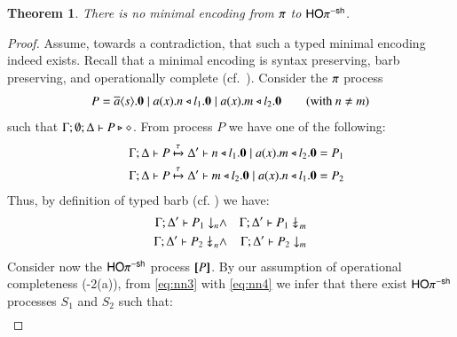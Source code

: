 \documentclass[preprint,11pt]{elsarticle}
\newtheorem{theorem}{Theorem}[section]
\begin{document}
{{%

\begin{theorem}%
	\label{t:negative}
	There is no minimal encoding from
		$\pi$ to $\mathsf{HO}\pi^{\mathsf{-sh}}$.
\end{theorem}


\begin{proof}
	Assume, towards a contradiction, that such a typed minimal encoding indeed exists. 
	Recall that a minimal encoding is syntax preserving,
	barb preserving, 
	and operationally complete (cf.~).
	Consider the $\pi$ process
	\[
		P = \overline{a} \langle s \rangle . \mathbf{0} \;|\; a (x) . n \triangleleft l_1 . \mathbf{0} \;|\; a (x) . m \triangleleft l_2 . \mathbf{0} \qquad \text{(with $n \neq m$)}
	\]
	\noi such that 
	$\Gamma; \emptyset; \Delta \vdash P \triangleright \diamond$.
	From process $P$ we have one of the following: %
	\begin{eqnarray}
		& & \Gamma; \Delta \vdash P \xmapsto{\tau} \Delta' \vdash n \triangleleft l_1 . \mathbf{0} \;|\; a (x) . m \triangleleft l_2 . \mathbf{0} = P_1 \label{eq:nn3} \\
		& & \Gamma; \Delta \vdash P \xmapsto{\tau} \Delta' \vdash m \triangleleft l_2 . \mathbf{0} \;|\; a (x) . n \triangleleft l_1 . \mathbf{0} = P_2 \label{eq:nn4}
	\end{eqnarray}
	Thus, by definition of typed barb (cf. ) we  have:
	\begin{eqnarray}
		\Gamma; \Delta' \vdash P_1 \downarrow_{n} & \land & 
		\Gamma; \Delta' \vdash P_1 \not\downarrow_{m} \label{eq:nn1} \\
		\Gamma; \Delta' \vdash P_2 \not\downarrow_{n}  & \land & 
		 \Gamma; \Delta' \vdash P_2 \downarrow_{m}
		\label{eq:nn2}
	\end{eqnarray}
	Consider now the $\mathsf{HO}\pi^{\mathsf{-sh}}$ process $[\!\![P]\!\!]$.
	By our assumption of operational completeness 
	(-2(a)), 
	from \eqref{eq:nn3} with \eqref{eq:nn4}
	we infer that
	there exist $\mathsf{HO}\pi^{\mathsf{-sh}}$ processes $S_1$ and $S_2$ such that:
	\begin{eqnarray}

\end{eqnarray}
\end{proof}}}
\end{document}
